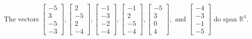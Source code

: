 \begin{exercise}
\begin{exerciseStatement}
  \end{exerciseStatement}
  \begin{exerciseAnswer}
   The vectors \(\left[\begin{array}{r}
-5 \\
3 \\
-5 \\
-3
\end{array}\right] , \left[\begin{array}{r}
2 \\
-5 \\
2 \\
-4
\end{array}\right] , \left[\begin{array}{r}
-1 \\
-3 \\
-2 \\
-4
\end{array}\right] , \left[\begin{array}{r}
-1 \\
2 \\
-5 \\
-4
\end{array}\right] , \left[\begin{array}{r}
-5 \\
3 \\
0 \\
4
\end{array}\right] , \text{ and } \left[\begin{array}{r}
-4 \\
-3 \\
-1 \\
-5
\end{array}\right]\) 
  	 do  
	span \(\mathbb{R}^4\).
  


  \end{exerciseAnswer}
\end{exercise}